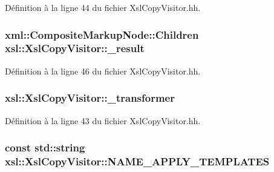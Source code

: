 Définition à la ligne 44 du fichier XslCopyVisitor.hh.

\hypertarget{classxsl_1_1_xsl_copy_visitor_af0d37e73a689f6e2fe7bc081ba0ac25f}{
\subsubsection[{\_\-result}]{\setlength{\rightskip}{0pt plus 5cm}xml::CompositeMarkupNode::Children {\bf xsl::XslCopyVisitor::\_\-result}}}
\label{classxsl_1_1_xsl_copy_visitor_af0d37e73a689f6e2fe7bc081ba0ac25f}


Définition à la ligne 46 du fichier XslCopyVisitor.hh.

\hypertarget{classxsl_1_1_xsl_copy_visitor_a62a8afbd16b10ef1c0bdf07e7aabf62e}{
\subsubsection[{\_\-transformer}]{ {\bf xsl::XslCopyVisitor::\_\-transformer}}}
\label{classxsl_1_1_xsl_copy_visitor_a62a8afbd16b10ef1c0bdf07e7aabf62e}


Définition à la ligne 43 du fichier XslCopyVisitor.hh.

\hypertarget{classxsl_1_1_xsl_copy_visitor_aafb7cd7f2bd7d9253d016804c8f2eeb6}{
\subsubsection[{NAME\_\-APPLY\_\-TEMPLATES}]{\setlength{\rightskip}{0pt plus 5cm}const std::string {\bf xsl::XslCopyVisitor::NAME\_\-APPLY\_\-TEMPLATES}}}
\label{classxsl_1_1_xsl_copy_visitor_aafb7cd7f2bd7d9253d016804c8f2eeb6}


